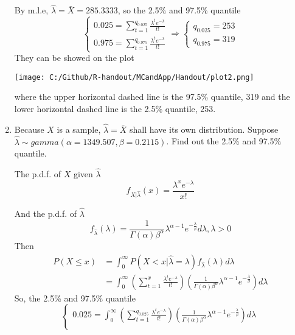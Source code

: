 \begin{enumerate}
	By m.l.e, $\hat{\lambda} = \bar{X} = 285.3333$, so the 2.5\% and 97.5\% quantile
	\begin{equation*}
		\begin{cases}
			0.025 = \sum_{t = 1}^{q_{0.025}}\frac{\lambda^{t}e^{-\lambda}}{t!} \\
			0.975 = \sum_{t = 1}^{q_{0.975}}\frac{\lambda^{t}e^{-\lambda}}{t!} 
		\end{cases} \Rightarrow \begin{cases}
			q_{0.025} = 253 \\
			q_{0.975} = 319
		\end{cases}
	\end{equation*}
	They can be showed on the plot
	\begin{center}
		\texttt{[image: C:/Github/R-handout/MCandApp/Handout/plot2.png]}
	\end{center}
	where the upper horizontal dashed line is the 97.5\% quantile, 319 and the lower horizontal dashed line is the 2.5\% quantile, 253.
	\item Because $X$ is a sample, $\hat{\lambda} = \bar{X}$ shall have its own distribution. Suppose $\hat{\lambda} \sim gamma(\alpha= 1349.507, \beta = 0.2115)$. Find out the 2.5\% and 97.5\% quantile.
	\par The p.d.f. of $X$ given $\hat{\lambda}$
	\begin{equation*}
			f_{X|\hat{\lambda}}(x) = \frac{\lambda^{x}e^{-\lambda}}{x!}
	\end{equation*}
	\par And the p.d.f. of $\hat{\lambda}$
	\begin{equation*}
		f_{\hat{\lambda}}(\lambda) = \frac{1}{\Gamma(\alpha)\beta^{\alpha}}\lambda^{\alpha - 1}e^{-\frac{\lambda}{\beta}}d\lambda, \lambda > 0
	\end{equation*}
	Then
	\begin{equation*}
		\begin{split}
			P(X \le x) &= \int_{0}^{\infty}P(X < x | \hat{\lambda} = \lambda)f_{\hat{\lambda}}(\lambda) d \lambda \\
			& = \int_{0}^{\infty}(\sum_{t = 1}^{x}\frac{\lambda^{t}e^{-\lambda}}{t!})(\frac{1}{\Gamma(\alpha)\beta^{\alpha}}\lambda^{\alpha - 1}e^{-\frac{\lambda}{\beta}}) d \lambda
		\end{split}
	\end{equation*}
	So, the 2.5\% and 97.5\% quantile
	\begin{equation*}
		\begin{cases}
		0.025 = \int_{0}^{\infty}(\sum_{t = 1}^{q_{0.025}}\frac{\lambda^{t}e^{-\lambda}}{t!})(\frac{1}{\Gamma(\alpha)\beta^{\alpha}}\lambda^{\alpha - 1}e^{-\frac{\lambda}{\beta}}) d \lambda \\

\end{cases}
\end{equation*}
\end{enumerate}
